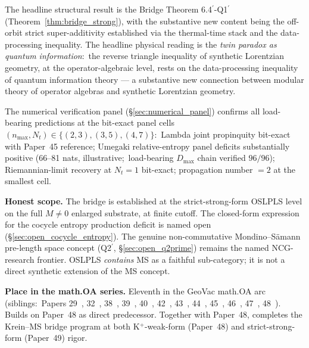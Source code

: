 \documentclass[11pt,a4paper]{article}
\theoremstyle{plain}
\theoremstyle{definition}
\newcommand{\nmax}{n_{\max}}
\newcommand{\Nt}{N_{t}}
\begin{document}
The headline structural result is the Bridge Theorem
6.4$^{\prime}$-Q1$^{\prime}$ (Theorem~\ref{thm:bridge_strong}), with
the substantive new content being the off-orbit strict
super-additivity established via the thermal-time stack and the
data-processing inequality. The headline physical reading is the
\emph{twin paradox as quantum information}:\ the reverse triangle
inequality of synthetic Lorentzian geometry, at the operator-algebraic
level, rests on the data-processing inequality of quantum information
theory --- a substantive new connection between modular theory of
operator algebras and synthetic Lorentzian geometry.

The numerical verification panel (\S\ref{sec:numerical_panel})
confirms all load-bearing predictions at the bit-exact panel cells
$(\nmax,\Nt)\in\{(2,3),(3,5),(4,7)\}$:\ Lambda joint propinquity
bit-exact with Paper~45 reference; Umegaki relative-entropy panel
deficits substantially positive (66--81 nats, illustrative;\
load-bearing $D_{\max}$ chain verified $96/96$); Riemannian-limit recovery at
$\Nt=1$ bit-exact; propagation number $=2$ at the smallest cell.

\textbf{Honest scope.} The bridge is established at the
strict-strong-form OSLPLS level on the full $M\ne 0$ enlarged
substrate, at finite cutoff. The closed-form expression for the
cocycle entropy production deficit is named open
(\S\ref{sec:open_cocycle_entropy}). The genuine non-commutative
Mondino--S\"amann pre-length space concept (Q2$^{\prime}$,
\S\ref{sec:open_q2prime}) remains the named NCG-research
frontier. OSLPLS \emph{contains} MS as a faithful sub-category;
it is not a direct synthetic extension of the MS concept.

\textbf{Place in the math.OA series.} Eleventh in the GeoVac
math.OA arc (siblings:\ Papers
29~\cite{paper29}, 32~\cite{paper32}, 38~\cite{paper38},
39~\cite{paper39}, 40~\cite{paper40_unified}, 42~\cite{paper42},
43~\cite{paper43}, 44~\cite{paper44}, 45~\cite{paper45},
46~\cite{paper46}, 47~\cite{paper47}, 48~\cite{paper48}). Builds on
Paper~48 as direct predecessor. Together with Paper~48, completes
the Krein--MS bridge program at both K$^{+}$-weak-form (Paper~48)
and strict-strong-form (Paper~49) rigor.
\end{document}
